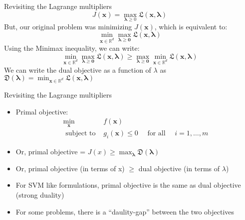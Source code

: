 \documentclass[xcolor=table]{beamer}
\begin{document}
\begin{frame}{Revisiting the Lagrange multipliers}
    \[
    J(\boldsymbol{x})=\max _{\boldsymbol{\lambda} \geqslant 0} \mathfrak{L}(\boldsymbol{x}, \boldsymbol{\lambda})
    \]
    \pause But, our original problem was minimizing $J(\boldsymbol{x})$, which is equivalent to: 
    \[
    \min _{\boldsymbol{x} \in \mathbb{R}^{d}} \max _{\boldsymbol{\lambda} \geqslant \mathbf{0}} \mathfrak{L}(\boldsymbol{x}, \boldsymbol{\lambda})
    \]
    \pause Using the Minimax inequality, we can write:
    \pause$$\min _{\boldsymbol{x} \in \mathbb{R}^{d}} \max _{\boldsymbol{\lambda} \geqslant \mathbf{0}} \mathfrak{L}(\boldsymbol{x}, \boldsymbol{\lambda}) \geqslant \max _{\boldsymbol{\lambda} \geqslant \mathbf{0}} \min _{\boldsymbol{x} \in \mathbb{R}^{d}} \mathfrak{L}(\boldsymbol{x}, \boldsymbol{\lambda})$$
    \pause We can write the dual objective as a function of $\lambda$ as $\mathfrak{D}(\boldsymbol{\lambda})=\min _{\boldsymbol{x} \in \mathbb{R}^{d}} \mathfrak{L}(\boldsymbol{x}, \boldsymbol{\lambda})$
\end{frame}

\begin{frame}{Revisiting the Lagrange multipliers}
    \begin{itemize}[<+->]
        \item Primal objective:  $$ \begin{array}{cl}
            \min _{\boldsymbol{x}} & f(\boldsymbol{x}) \\
            \text { subject to } & g_{i}(\boldsymbol{x}) \leqslant 0 \quad \text { for all } \quad i=1, \ldots, m
            \end{array}$$

        \item Or, primal objective = $J(x) \geq \max _{\boldsymbol{\lambda}}\mathfrak{D}(\boldsymbol{\lambda}) $     
        \item Or, primal objective (in terms of x) $\geq $ dual objective (in terms of $\lambda$)
        \item For SVM like formulations, primal objective is the same as dual objective (strong duality)
        \item For some problems, there is a ``daulity-gap'' between the two objectives
    \end{itemize}
\end{frame}
\end{document}
